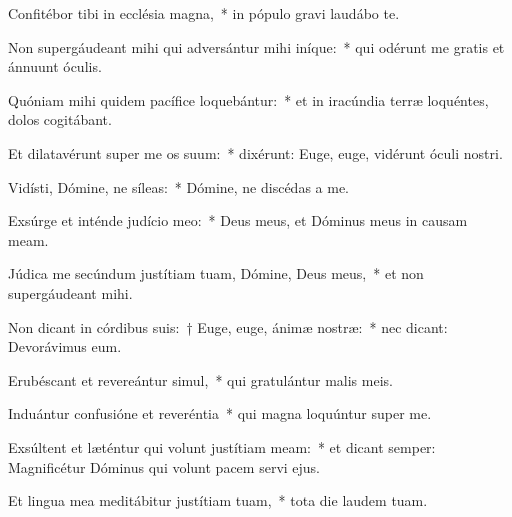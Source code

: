 
\item Confitébor tibi in ecclésia magna,~* in pópulo gravi laudábo te.

\item Non supergáudeant mihi qui adversántur mihi iníque:~* qui odérunt me gratis et ánnuunt óculis.

\item Quóniam mihi quidem pacífice loquebántur:~* et in iracúndia terræ loquéntes, dolos cogitábant.

\item Et dilatavérunt super me os suum:~* dixérunt: Euge, euge, vidérunt óculi nostri.

\item Vidísti, Dómine, ne síleas:~* Dómine, ne discédas a me.

\item Exsúrge et inténde judício meo:~* Deus meus, et Dóminus meus in causam meam.

\item Júdica me secúndum justítiam tuam, Dómine, Deus meus,~* et non supergáudeant mihi.

\item Non dicant in córdibus suis:~† Euge, euge, ánimæ nostræ:~* nec dicant: Devorávimus eum.

\item Erubéscant et revereántur simul,~* qui gratulántur malis meis.

\item Induántur confusióne et reveréntia~* qui magna loquúntur super me.

\item Exsúltent et læténtur qui volunt justítiam meam:~* et dicant semper: Magnificétur Dóminus qui volunt pacem servi ejus.

\item Et lingua mea meditábitur justítiam tuam,~* tota die laudem tuam.